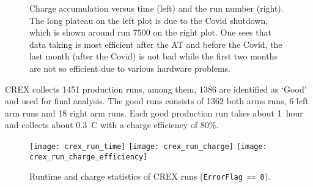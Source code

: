 \begin{figure}[!h]
    \caption[charge accumulation]
    {Charge accumulation versus time (left) and the run number (right). The
    long plateau on the left plot is due to the Covid shutdown, which is shown around
    run 7500 on the right plot. One sees that data taking is most efficient after
    the AT and before the Covid, the last month (after the Covid) is not bad while the 
    first two months are not so efficient due to various hardware problems.}
\end{figure}

CREX collects 1451 production runs, among them, 1386 are identified as `Good'
and used for final analysis. The good runs consists of 1362 both arms runs,
6 left arm runs and 18 right arm runs. Each good production run takes about 1~hour
and collects about 0.3~C with a charge efficiency of 80\%.
\begin{figure}[!h]
    \texttt{[image: crex\_run\_time]}
    \texttt{[image: crex\_run\_charge]}
    \texttt{[image: crex\_run\_charge\_efficiency]}
    \caption{Runtime and charge statistics of CREX runs (\texttt{ErrorFlag == 0}).}
\end{figure}

